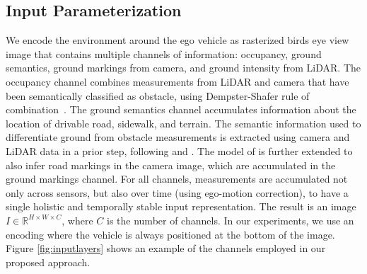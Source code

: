 \documentclass[10pt,twocolumn,letterpaper]{article}
\begin{document}
\subsection{Input Parameterization}
\label{sect:data}
We encode the environment around the ego vehicle as rasterized bird\textquotesingle s eye view image that contains multiple channels of information: occupancy, ground semantics, ground markings from camera, and ground intensity from LiDAR. The occupancy channel combines measurements from LiDAR and camera that have been semantically classified as obstacle, using Dempster-Shafer rule of combination~\cite{Dempster1968}. The ground semantics channel accumulates information about the location of drivable road, sidewalk, and terrain. The semantic information used to differentiate ground from obstacle measurements is extracted using camera and LiDAR data in a prior step, following \cite{HernandezJuarez2019SlantedSA} and \cite{piewak2018improved}. The model of \cite{HernandezJuarez2019SlantedSA} is further extended to also infer road markings in the camera image, which are accumulated in the ground markings channel. For all channels, measurements are accumulated not only across sensors, but also over time (using ego-motion correction), to have a single holistic and temporally stable input representation. The result is an image
$I \in \mathbb{R}^{H \times W \times C}$, where $C$ is the number of channels. In our experiments, we use an encoding where the vehicle is always positioned at the bottom  of the image. Figure \ref{fig:inputlayers} shows an example of the channels employed in our proposed approach.
\end{document}
